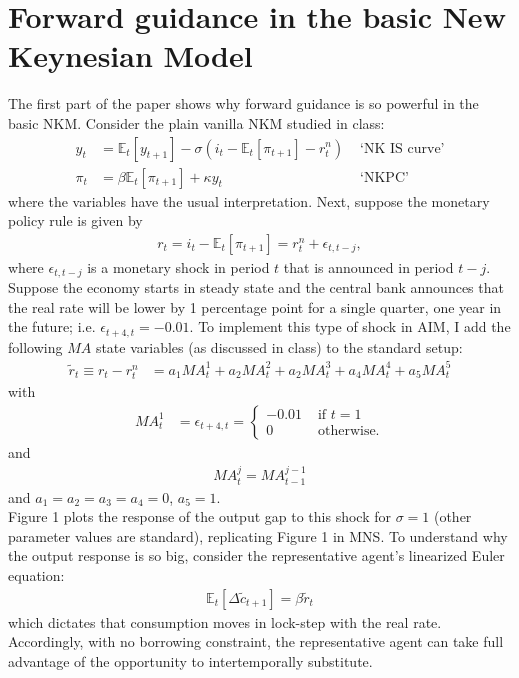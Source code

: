\documentclass[12pt]{article}
\newcommand{\E}{\mathbb{E}}
\newcommand{\e}{\epsilon}
\begin{document}
\section{Forward guidance in the basic New Keynesian Model}
The first part of the paper shows why forward guidance is so powerful in the basic NKM. Consider the plain vanilla NKM studied in class:
\begin{align*}
y_t &= \E_t[y_{t+1}] - \sigma(i_t - \E_t[\pi_{t+1}] - r_t^n) &\text{ `NK IS curve'}\\
\pi_t  &= \beta\E_t[\pi_{t+1}]  + \kappa y_t &\text{ `NKPC'}
\end{align*}
where the variables have the usual interpretation. Next, suppose the monetary policy rule is given by
\begin{align*}
r_t = i_t - \E_t[\pi_{t+1}] = r_t^n + \e_{t,t-j},
\end{align*}
where $\e_{t,t-j}$ is a monetary shock in period $t$ that is announced in period $t-j$. Suppose the economy starts in steady state and the central bank announces that the real rate will be lower by 1 percentage point for a single quarter, one year in the future; i.e. $\e_{t+4,t} = -0.01.$ To implement this type of shock in AIM, I add the following $MA$ state variables (as discussed in class) to the standard setup:
\begin{align*}
\tilde{r}_t \equiv r_t - r_t^n &= a_1MA_t^1 + a_2MA_t^2 + a_2MA_t^3 + a_4MA_t^4 + a_5MA_t^5
\end{align*}
with
\begin{align*}
MA_t^1 &= \e_{t+4,t}=
\begin{cases}
-0.01 &\text{ if } t=1 \\
0 &\text{ otherwise.}
\end{cases}
\end{align*} 
and
\begin{align*}
MA^j_t = MA_{t-1}^{j-1}
\end{align*}
and $a_1=a_2=a_3=a_4=0$, $a_5 = 1$.\\

Figure 1 plots the response of the output gap to this shock for $\sigma=1$ (other parameter values are standard), replicating Figure 1 in MNS. To understand why the output response is so big, consider the representative agent's linearized Euler equation:
\begin{align*}
\E_t[\Delta\tilde{c}_{t+1}] = \beta \tilde{r}_t 
\end{align*}
which dictates that consumption moves in lock-step with the real rate. Accordingly, with no borrowing constraint, the representative agent can take full advantage of the opportunity to intertemporally substitute.
\end{document}
